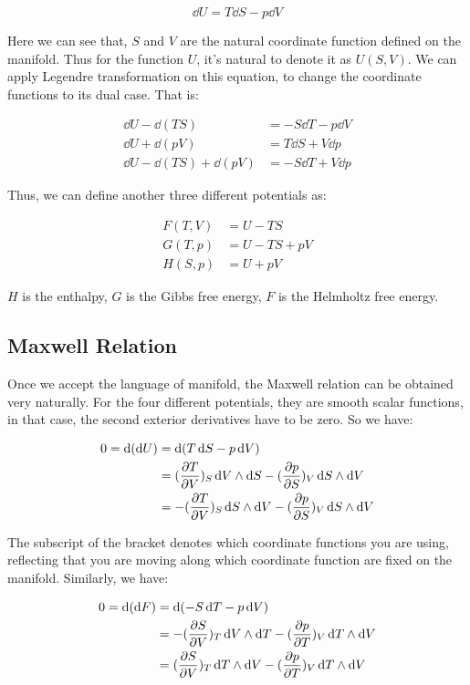 \documentclass[../main.tex]{subfiles}
\begin{document}
\begin{equation}
    \dd{U} = T\dd{S} - p\dd{V}
\end{equation}

Here we can see that, $S$ and $V$ are the natural coordinate function defined on the manifold. Thus for the function $U$, it's natural to denote it as $U(S, V)$. We can apply Legendre transformation on this equation, to change the coordinate functions to its dual case. That is:

\begin{align}
    \dd{U} - \dd{(TS)} &= -S\dd{T} -p\dd{V}\\
    \dd{U} + \dd{(pV)} &= T\dd{S} + V\dd{p}\\
    \dd{U} - \dd{(TS)} + \dd{(pV)} &= -S\dd{T} +V\dd{p}
\end{align}

Thus, we can define another three different potentials as:

\begin{align}
    F(T, V) &= U - TS\\
    G(T, p) &= U - TS + pV\\
    H(S, p) &= U + pV
\end{align}

$H$ is the enthalpy, $G$ is the Gibbs free energy, $F$ is the Helmholtz free energy.

\subsection{Maxwell Relation}

Once we accept the language of manifold, the Maxwell relation can be obtained very naturally. For the four different potentials, they are smooth scalar functions, in that case, the second exterior derivatives have to be zero. So we have:

\begin{align}
    0 = \dd{(\dd{U})} &= \dd{(T\dd{S}-p\dd{V})}\nonumber\\
    &= (\pdv{T}{V})_S\dd{V}\wedge\dd{S} - (\pdv{p}{S})_V\dd{S}\wedge\dd{V}\nonumber\\
    &= -(\pdv{T}{V})_S\dd{S}\wedge\dd{V} - (\pdv{p}{S})_V\dd{S}\wedge\dd{V}
\end{align}

The subscript of the bracket denotes which coordinate functions you are using, reflecting that you are moving along which coordinate function are fixed on the manifold. Similarly, we have:

\begin{align}
    0 = \dd{(\dd{F})} &= \dd{(-S\dd{T} -p\dd{V})}\nonumber\\
    &= -(\pdv{S}{V})_T\dd{V}\wedge\dd{T} - (\pdv{p}{T})_V\dd{T}\wedge\dd{V}\nonumber\\
    &= (\pdv{S}{V})_T\dd{T}\wedge\dd{V} - (\pdv{p}{T})_V\dd{T}\wedge\dd{V}
\end{align}
\end{document}

